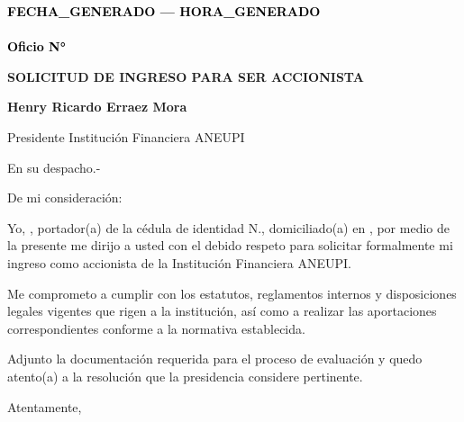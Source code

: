 \documentclass[a4paper,12pt]{article}
\begin{document}
\pagestyle{empty}

\vspace*{-5.5cm}
\begin{flushright}
{\footnotesize \textcolor{black}{\textbf{{{FECHA_GENERADO}} --- {{{HORA_GENERADO}}}}}} \\[-10pt] %
{\footnotesize \textcolor{black}{\underline{\hspace{7.5cm}}}} \\[-2pt] %
{\footnotesize \textcolor{black}{\textbf{Oficio N° }}} 
\end{flushright}


\vspace{2.5cm}
\noindent
\hspace*{\dimexpr\textwidth+1cm\relax}


\begin{center}
    \textbf{\large SOLICITUD DE INGRESO PARA SER ACCIONISTA}
\end{center}

\vspace{0.8cm}

\noindent \textbf{Henry Ricardo Erraez Mora} 

\noindent Presidente Institución Financiera ANEUPI 

\noindent En su despacho.-

\vspace{1cm}

\noindent De mi consideración:

\noindent Yo,  \textbf{\underline{\hspace{6cm}}}, portador(a) de la cédula de identidad N.\textbf{\underline{\hspace{4cm}}}, domiciliado(a) en \textbf{\underline{\hspace{8cm}}}, por medio de la presente me dirijo a usted con el debido respeto para solicitar formalmente mi ingreso como accionista de la Institución Financiera ANEUPI.

\vspace{0.5cm}

\noindent Me comprometo a cumplir con los estatutos, reglamentos internos y disposiciones legales vigentes que rigen a la institución, así como a realizar las aportaciones correspondientes conforme a la normativa establecida.

\vspace{0.5cm}

\noindent Adjunto la documentación requerida para el proceso de evaluación y quedo atento(a) a la resolución que la presidencia considere pertinente.

\noindent Atentamente,

\vspace{2.5cm}


\noindent{}  

\noindent{}      

\noindent{}  

\noindent{} 
\end{document}
